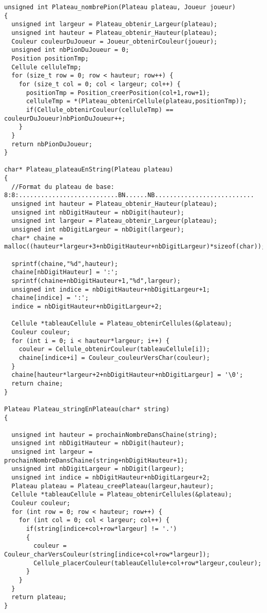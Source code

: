 \begin{lstlisting}
unsigned int Plateau_nombrePion(Plateau plateau, Joueur joueur)
{
  unsigned int largeur = Plateau_obtenir_Largeur(plateau);
  unsigned int hauteur = Plateau_obtenir_Hauteur(plateau);
  Couleur couleurDuJoueur = Joueur_obtenirCouleur(joueur);
  unsigned int nbPionDuJoueur = 0;
  Position positionTmp;
  Cellule celluleTmp;
  for (size_t row = 0; row < hauteur; row++) {
    for (size_t col = 0; col < largeur; col++) {
      positionTmp = Position_creerPosition(col+1,row+1);
      celluleTmp = *(Plateau_obtenirCellule(plateau,positionTmp));
      if(Cellule_obtenirCouleur(celluleTmp) == couleurDuJoueur)nbPionDuJoueur++;
    }
  }
  return nbPionDuJoueur;
}

char* Plateau_plateauEnString(Plateau plateau)
{
  //Format du plateau de base: 8:8:...........................BN......NB...........................
  unsigned int hauteur = Plateau_obtenir_Hauteur(plateau);
  unsigned int nbDigitHauteur = nbDigit(hauteur);
  unsigned int largeur = Plateau_obtenir_Largeur(plateau);
  unsigned int nbDigitLargeur = nbDigit(largeur);
  char* chaine = malloc((hauteur*largeur+3+nbDigitHauteur+nbDigitLargeur)*sizeof(char));

  sprintf(chaine,"%d",hauteur);
  chaine[nbDigitHauteur] = ':';
  sprintf(chaine+nbDigitHauteur+1,"%d",largeur);
  unsigned int indice = nbDigitHauteur+nbDigitLargeur+1;
  chaine[indice] = ':';
  indice = nbDigitHauteur+nbDigitLargeur+2;

  Cellule *tableauCellule = Plateau_obtenirCellules(&plateau);
  Couleur couleur;
  for (int i = 0; i < hauteur*largeur; i++) {
    couleur = Cellule_obtenirCouleur(tableauCellule[i]);
    chaine[indice+i] = Couleur_couleurVersChar(couleur);
  }
  chaine[hauteur*largeur+2+nbDigitHauteur+nbDigitLargeur] = '\0';
  return chaine;
}

Plateau Plateau_stringEnPlateau(char* string)
{

  unsigned int hauteur = prochainNombreDansChaine(string);
  unsigned int nbDigitHauteur = nbDigit(hauteur);
  unsigned int largeur = prochainNombreDansChaine(string+nbDigitHauteur+1);
  unsigned int nbDigitLargeur = nbDigit(largeur);
  unsigned int indice = nbDigitHauteur+nbDigitLargeur+2;
  Plateau plateau = Plateau_creePlateau(largeur,hauteur);
  Cellule *tableauCellule = Plateau_obtenirCellules(&plateau);
  Couleur couleur;
  for (int row = 0; row < hauteur; row++) {
    for (int col = 0; col < largeur; col++) {
      if(string[indice+col+row*largeur] != '.')
      {
        couleur = Couleur_charVersCouleur(string[indice+col+row*largeur]);
        Cellule_placerCouleur(tableauCellule+col+row*largeur,couleur);
      }
    }
  }
  return plateau;
}



\end{lstlisting}
